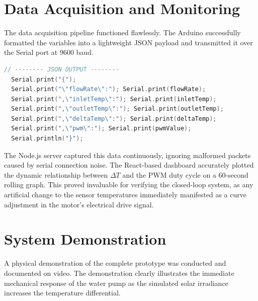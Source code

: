 \documentclass[12pt,a4paper]{report}
\begin{document}
\section{Data Acquisition and Monitoring}
The data acquisition pipeline functioned flawlessly. The Arduino successfully formatted the variables into a lightweight JSON payload and transmitted it over the Serial port at 9600 baud. 

\begin{lstlisting}[language=C]
  // -------- JSON OUTPUT --------
  Serial.print("{");
  Serial.print("\"flowRate\":"); Serial.print(flowRate);
  Serial.print(",\"inletTemp\":"); Serial.print(inletTemp);
  Serial.print(",\"outletTemp\":"); Serial.print(outletTemp);
  Serial.print(",\"deltaTemp\":"); Serial.print(deltaTemp);
  Serial.print(",\"pwm\":"); Serial.print(pwmValue);
  Serial.println("}");
\end{lstlisting}

The Node.js server captured this data continuously, ignoring malformed packets caused by serial connection noise. The React-based dashboard accurately plotted the dynamic relationship between $\Delta T$ and the PWM duty cycle on a 60-second rolling graph. This proved invaluable for verifying the closed-loop system, as any artificial change to the sensor temperatures immediately manifested as a curve adjustment in the motor's electrical drive signal.

\section{System Demonstration}
A physical demonstration of the complete prototype was conducted and documented on video. The demonstration clearly illustrates the immediate mechanical response of the water pump as the simulated solar irradiance increases the temperature differential. 
\end{document}
